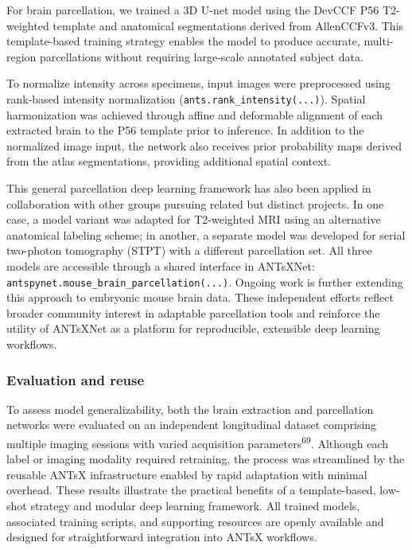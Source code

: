 \documentclass[
  12pt,
]{article}
\begin{document}
For brain parcellation, we trained a 3D U-net model using the DevCCF P56
T2-weighted template and anatomical segmentations derived from
AllenCCFv3. This template-based training strategy enables the model to
produce accurate, multi-region parcellations without requiring
large-scale annotated subject data.

To normalize intensity across specimens, input images were preprocessed
using rank-based intensity normalization
(\texttt{ants.rank\_intensity(...)}). Spatial harmonization was achieved
through affine and deformable alignment of each extracted brain to the
P56 template prior to inference. In addition to the normalized image
input, the network also receives prior probability maps derived from the
atlas segmentations, providing additional spatial context.

This general parcellation deep learning framework has also been applied
in collaboration with other groups pursuing related but distinct
projects. In one case, a model variant was adapted for T2-weighted MRI
using an alternative anatomical labeling scheme; in another, a separate
model was developed for serial two-photon tomography (STPT) with a
different parcellation set. All three models are accessible through a
shared interface in ANTsXNet:
\texttt{antspynet.mouse\_brain\_parcellation(...)}. Ongoing work is
further extending this approach to embryonic mouse brain data. These
independent efforts reflect broader community interest in adaptable
parcellation tools and reinforce the utility of ANTsXNet as a platform
for reproducible, extensible deep learning workflows.

\subsubsection{Evaluation and reuse}\label{evaluation-and-reuse}

To assess model generalizability, both the brain extraction and
parcellation networks were evaluated on an independent longitudinal
dataset comprising multiple imaging sessions with varied acquisition
parameters\textsuperscript{69}. Although each label or imaging modality
required retraining, the process was streamlined by the reusable ANTsX
infrastructure enabled by rapid adaptation with minimal overhead. These
results illustrate the practical benefits of a template-based, low-shot
strategy and modular deep learning framework. All trained models,
associated training scripts, and supporting resources are openly
available and designed for straightforward integration into ANTsX
workflows.
\end{document}
